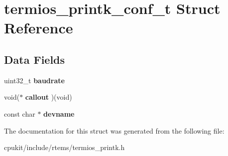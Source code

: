 \hypertarget{structtermios__printk__conf__t}{}\section{termios\+\_\+printk\+\_\+conf\+\_\+t Struct Reference}
\label{structtermios__printk__conf__t}
\subsection*{Data Fields}
\begin{DoxyCompactItemize}
\item 
\mbox{\label{structtermios__printk__conf__t_a1d7f4e1db247600f1303ad27d0b5e5aa}} 
uint32\+\_\+t {\bfseries baudrate}
\item 
\mbox{\label{structtermios__printk__conf__t_a51847aa1a86baf72c249932d48bb18cd}} 
void($\ast$ {\bfseries callout} )(void)
\item 
\mbox{\label{structtermios__printk__conf__t_a5140e2ff78744dccee77650a1d1f553d}} 
const char $\ast$ {\bfseries devname}
\end{DoxyCompactItemize}


The documentation for this struct was generated from the following file\+:\begin{DoxyCompactItemize}
\item 
cpukit/include/rtems/termios\+\_\+printk.\+h\end{DoxyCompactItemize}
